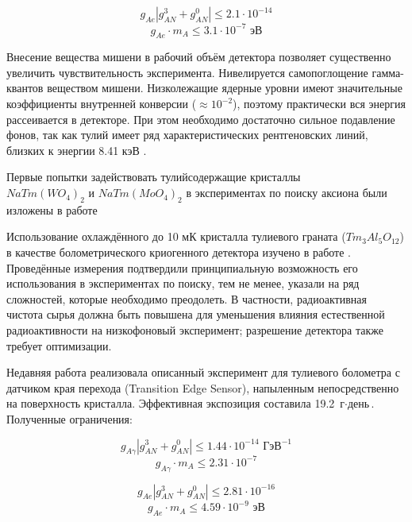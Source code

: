 \documentclass[a4paper,article,14pt]{extarticle}
\begin{document}
\begin{equation}
    {g_{Ae }}\left| {g_{AN}^3 + g_{AN}^0} \right| \leqslant 2.1 \cdot {10^{ - 14}}
\end{equation}
\begin{equation}
{g_{Ae }} \cdot {m_A} \leqslant 3.1 \cdot {10^{ - 7}} \text{ эВ}
\end{equation}

Внесение вещества мишени в рабочий объём детектора позволяет существенно увеличить чувствительность эксперимента. Нивелируется самопоглощение гамма-квантов веществом мишени. Низколежащие ядерные уровни имеют значительные коэффициенты внутренней конверсии  ($\approx 10^{-2}$), поэтому практически вся энергия рассеивается в детекторе. При этом необходимо достаточно сильное подавление фонов, так как тулий имеет ряд характеристических рентгеновских линий, близких к энергии 8.41 кэВ \cite{Derbin2009}.

Первые попытки задействовать тулийсодержащие кристаллы \\ $NaTm{\left( {W{O_4}} \right)_2}$ и $NaTm{\left( {Mo{O_4}} \right)_2}$ в экспериментах по поиску аксиона были изложены в работе \cite{tm_first}

Использование охлаждённого до 10 мК кристалла тулиевого граната ($Tm_3Al_5O_{12}$) в качестве болометрического криогенного детектора изучено в работе \cite{test_bolometric_tm}. Проведённые измерения подтвердили принципиальную возможность его использования в экспериментах по поиску, тем не менее, указали на ряд сложностей, которые необходимо преодолеть. В частности, радиоактивная чистота сырья должна быть повышена для уменьшения влияния естественной радиоактивности на низкофоновый эксперимент; разрешение детектора также требует оптимизации.

Недавняя работа \cite{newlimits_tm} реализовала описанный эксперимент для тулиевого болометра с датчиком края перехода (Transition Edge Sensor), напыленным непосредственно на поверхность кристалла. Эффективная экспозиция составила 19.2 $\text{г} \cdot \text{день}$. Полученные ограничения:

\begin{equation}
    {g_{A\gamma }}\left| {g_{AN}^3 + g_{AN}^0} \right| \leqslant 1.44 \cdot {10^{ - 14}} \text{ ГэВ}^{-1}
\end{equation}
\begin{equation}
{g_{A\gamma }} \cdot {m_A} \leqslant 2.31 \cdot {10^{ - 7}}
\end{equation}

\begin{equation}
    {g_{Ae }}\left| {g_{AN}^3 + g_{AN}^0} \right| \leqslant 2.81 \cdot {10^{ - 16}}
\end{equation}
\begin{equation}
{g_{Ae }} \cdot {m_A} \leqslant 4.59 \cdot {10^{ - 9}} \text{ эВ}
\end{equation}
\end{document}
